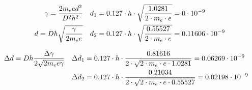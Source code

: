 \documentclass[12pt,a4paper]{article}
\newcommand{\CalcFive} [1]{\fpeval{round((#1),5)}}
\def\D {\fpeval{127 * 10^(-3)}} %
\def\h {\fpeval{6.62607015 * 10^(-34)}} %
\def\me{\fpeval{9.10938356 * 10^(-31)}} %
\def\ee{\fpeval{1.602176634 * 10^(-19)}} %
\begin{document}
\def\dOne{\fpeval{\D *  * sqrt(\GammaMeanOne / (2 * \me * \ee))}}
\def\dTwo{\fpeval{\D * \h * sqrt(\GammaMeanTwo / (2 * \me * \ee))}}

\begin{equation*}
    \begin{aligned}
        \gamma = \frac{2m_eed^2}{D^2h^2} \quad & d_1 = \CalcFive{\D} \cdot h \cdot \sqrt{\frac{\CalcFive{\GammaMeanOne}}{2 \cdot m_e \cdot e}} = \CalcFive{\dOne * 10^9} \cdot 10^{-9} \\
        \quad d = Dh \sqrt{\frac{\gamma}{2m_ee}} \quad & d_2 = \CalcFive{\D} \cdot h \cdot \sqrt{\frac{\CalcFive{\GammaMeanTwo}}{2 \cdot m_e \cdot e}} = \CalcFive{\dTwo * 10^9} \cdot 10^{-9}
    \end{aligned}
\end{equation*}

\def\DeltaDOne{\fpeval{\D * \h * \GammaDeltaOne / (2 * sqrt(2 * \me * \ee * \GammaMeanOne))}}
\def\DeltaDTwo{\fpeval{\D * \h * \GammaDeltaTwo / (2 * sqrt(2 * \me * \ee * \GammaMeanTwo))}}

\begin{equation*}
    \begin{aligned}
        \Delta d = Dh \frac{\Delta\gamma}{2\sqrt{2m_ee\gamma}} \quad & \Delta d_1 = \CalcFive{\D} \cdot h \cdot \frac{\CalcFive{\GammaDeltaOne}}{2 \cdot \sqrt{2 \cdot m_e \cdot e \cdot \CalcFive{\GammaMeanOne}}} = \CalcFive{\DeltaDOne * 10^9} \cdot 10^{-9} \\
        & \Delta d_2 = \CalcFive{\D} \cdot h \cdot \frac{\CalcFive{\GammaDeltaTwo}}{2 \cdot \sqrt{2 \cdot m_e \cdot e \cdot \CalcFive{\GammaMeanTwo}}} = \CalcFive{\DeltaDTwo * 10^9} \cdot 10^{-9}
    \end{aligned}
\end{equation*}
\end{document}
